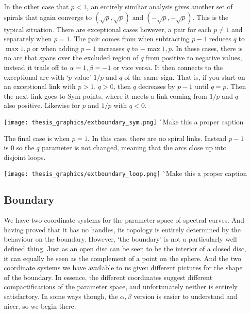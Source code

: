 In the other case that $p<1$, an entirely similiar analysis gives another set of spirals that again converge to $(\sqrt{p},\sqrt{p})$ and $(-\sqrt{p},-\sqrt{p})$. This is the typical situation. There are exceptional cases however, a pair for each $p\neq 1$ and separately when $p=1$. The pair comes from when subtracting $p-1$ reduces $q$ to $\max{1,p}$ or when adding $p-1$ increases $q$ to $-\max{1,p}$. In these cases, there is no arc that spans over the excluded region of $q$ from positive to negative values, instead it trails off to $α=1,β=-1$ or vice versa. It then connects to the exceptional arc with `$p$ value' $1/p$ and $q$ of the same sign. That is, if you start on an exceptional link with $p>1$, $q>0$, then $q$ decreases by $p-1$ until $q=p$. Then the next link goes to Sym points, where it meets a link coming from $1/p$ and $q$ also positive. Likewise for $p$ and $1/p$ with $q<0$.
\begin{center}
\texttt{[image: thesis\_graphics/extboundary\_sym.png]}
^^ Make this a proper caption
\end{center}

The final case is when $p=1$. In this case, there are no spiral links. Instead $p-1$ is $0$ so the $q$ parameter is not changed, meaning that the arcs close up into disjoint loops.
\begin{center}
\texttt{[image: thesis\_graphics/extboundary\_loop.png]}
^^ Make this a proper caption
\end{center}










\subsection{Boundary}
\label{sub:Boundary}
We have two coordinate systems for the parameter space of spectral curves. And having proved that it has no handles, its topology is entirely determined by the behaviour on the boundary. However, `the boundary' is not a particularly well defined thing. Just as an open disc can be seen to be the interior of a closed disc, it can equally be seen as the complement of a point on the sphere. And the two coordinate systems we have available to us given different pictures for the shape of the boundary. In essence, the different coordinates suggest different compactifications of the parameter space, and unfortunately neither is entirely satisfactory. In some ways though, the $α,β$ version is easier to understand and nicer, so we begin there.

